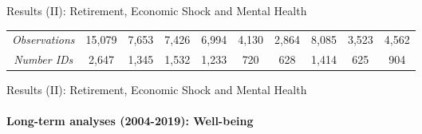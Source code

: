 \documentclass{beamer}
\begin{document}
\begin{frame}{Results (II): Retirement, Economic Shock and Mental Health}
\begin{table}[h]
{\begin{tabular}{@{}lccccccccc@{}}
\multicolumn{1}{c}{\textit{Observations}} & 15,079 & 7,653 & 7,426 & 6,994 & 4,130 & 2,864 & 8,085 & 3,523 & 4,562 \\
\multicolumn{1}{c}{\textit{Number IDs}} & 2,647 & 1,345 & 1,532 & 1,233 & 720 & 628 & 1,414 & 625 & 904 \\ \bottomrule
\end{tabular}%
}
\end{table}

\end{frame}




    \begin{frame}{Results (II): Retirement, Economic Shock and Mental Health}
    \framesubtitle{Long-term analyses (2004-2019): Well-being}

\begin{table}[h]
\centering


\end{table}
\end{frame}
\end{document}
